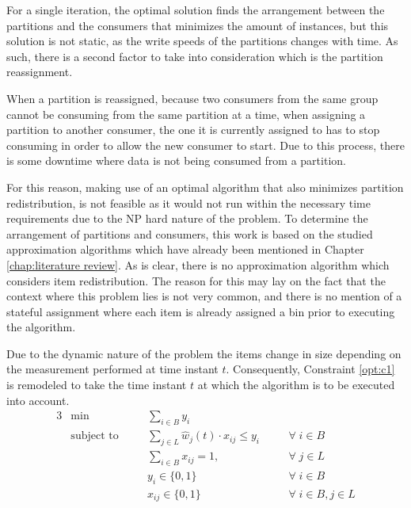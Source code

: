 For a single iteration, the optimal solution finds the arrangement between the
partitions and the consumers that minimizes the amount of instances, but this
solution is not static, as the write speeds of the partitions changes with time.
As such, there is a second factor to take into consideration which is the
partition reassignment. 

When a partition is reassigned, because two consumers from the same group cannot
be consuming from the same partition at a time, when assigning a partition to
another consumer, the one it is currently assigned to has to stop consuming in
order to allow the new consumer to start. Due to this process, there is some
downtime where data is not being consumed from a partition.

For this reason, making use of an optimal algorithm that also minimizes
partition redistribution, is not feasible as it would not run within the
necessary time requirements due to the NP hard nature of the problem.  To
determine the arrangement of partitions and consumers, this work is based on the
studied approximation algorithms which have already been mentioned in Chapter
\ref{chap:literature review}. As is clear, there is no approximation algorithm
which considers item redistribution. The reason for this may lay on the fact
that the context where this problem lies is not very common, and there is no
mention of a stateful assignment where each item is already assigned a bin prior
to executing the algorithm.

Due to the dynamic nature of the problem the items change in size depending on
the measurement performed at time instant $t$. Consequently, Constraint
\ref{opt:c1} is remodeled to take the time instant $t$ at which the algorithm is
to be executed into account.
\begin{alignat}{3}
\label{BPP model}
    &\min       
        &&\sum_{i \in B} y_i 
            && \\
    &\text{subject to} \quad
        && \sum_{j \in L} \hat w_j(t) \cdot x_{ij} \leq y_i \quad      
            && \forall \; i \in B \\
    &   && \sum_{i \in B} x_{ij} = 1, \quad                             
            && \forall \; j \in L \\
    &   && y_i \in \{0, 1\}                                             
            && \forall \; i \in B \\
    &   && x_{ij} \in \{0,1\}                                           
            && \forall \; i \in B, j \in L
\end{alignat}

